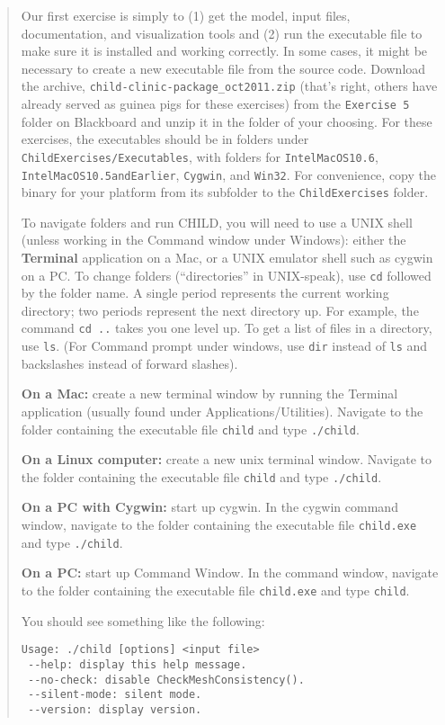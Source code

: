 \documentclass[12pt,reqno]{amsart}
\begin{document}
\begin{quote}
\small
{\sf
Our first exercise is simply to (1) get the model, input files,
documentation, and visualization tools and (2) run the executable file
to make sure it is installed and working correctly. In some cases, it
might be necessary to create a new executable file from the source
code. Download the archive, {\tt child-clinic-package\_oct2011.zip}
(that's right, others have already served as guinea pigs for these
exercises) from the {\tt Exercise 5} folder on Blackboard and unzip it in the
folder of your choosing. For these exercises, the executables should be in folders under {\tt ChildExercises/Executables}, with folders for {\tt IntelMacOS10.6}, {\tt IntelMacOS10.5andEarlier}, {\tt Cygwin}, and {\tt Win32}. For convenience, copy the binary for your platform from its subfolder to the {\tt ChildExercises} folder.

To navigate folders and run CHILD, you will need to use a UNIX shell (unless working in the Command window under Windows): either the {\bf Terminal} application on a Mac, or a UNIX emulator shell such as cygwin on a PC. To change folders (``directories'' in UNIX-speak), use {\tt cd} followed by the folder name. A single period represents the current working directory; two periods represent the next directory up. For example, the command {\tt cd ..} takes you one level up. To get a list of files in a directory, use {\tt ls}. (For Command prompt under windows, use {\tt dir} instead of {\tt ls} and backslashes instead of forward slashes).

{\bf On a Mac:} create a new terminal window by running the Terminal application (usually found under Applications/Utilities). Navigate to the folder containing the executable file {\tt child} and type {\tt ./child}.

{\bf On a Linux computer:} create a new unix terminal window. Navigate to the folder containing the executable file {\tt child} and type {\tt ./child}.

{\bf On a PC with Cygwin:} start up cygwin. In the cygwin command window, navigate to the folder containing the executable file {\tt child.exe} and type {\tt ./child}.

{\bf On a PC:} start up Command Window. In the command window, navigate to the folder containing the executable file {\tt child.exe} and type {\tt child}.

You should see something like the following:
\begin{verbatim}
Usage: ./child [options] <input file>
 --help: display this help message.
 --no-check: disable CheckMeshConsistency().
 --silent-mode: silent mode.
 --version: display version.
\end{verbatim}

}
\end{quote}
\end{document}

